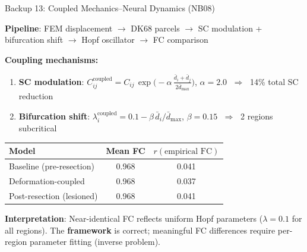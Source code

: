 \begin{frame}{Backup 13: Coupled Mechanics--Neural Dynamics (NB08)}

  \small

  \textbf{Pipeline}: FEM displacement $\to$ DK68 parcels
  $\to$ SC modulation + bifurcation shift $\to$ Hopf oscillator
  $\to$ FC comparison

  \medskip

  \textbf{Coupling mechanisms:}
  \begin{enumerate}
    \item \textbf{SC modulation}: $C_{ij}^{\text{coupled}}
      = C_{ij}\,\exp\!\bigl(-\alpha\,\tfrac{\bar{d}_i + \bar{d}_j}
      {2\bar{d}_{\max}}\bigr)$,\; $\alpha = 2.0$
      $\;\Rightarrow\;$ 14\% total SC reduction
    \item \textbf{Bifurcation shift}: $\lambda_i^{\text{coupled}}
      = 0.1 - \beta\,\bar{d}_i/\bar{d}_{\max}$,\; $\beta = 0.15$
      $\;\Rightarrow\;$ 2 regions subcritical
  \end{enumerate}

  \medskip

  \begin{tabular}{lcc}
    \toprule
    \textbf{Model} & \textbf{Mean FC} & $r(\text{empirical FC})$ \\
    \midrule
    Baseline (pre-resection) & 0.968 & 0.041 \\
    Deformation-coupled & 0.968 & 0.037 \\
    Post-resection (lesioned) & 0.968 & 0.041 \\
    \bottomrule
  \end{tabular}

  \medskip

  \textbf{Interpretation}: Near-identical FC reflects uniform Hopf
  parameters ($\lambda = 0.1$ for all regions). The \textbf{framework}
  is correct; meaningful FC differences require per-region parameter
  fitting (inverse problem).

\end{frame}

